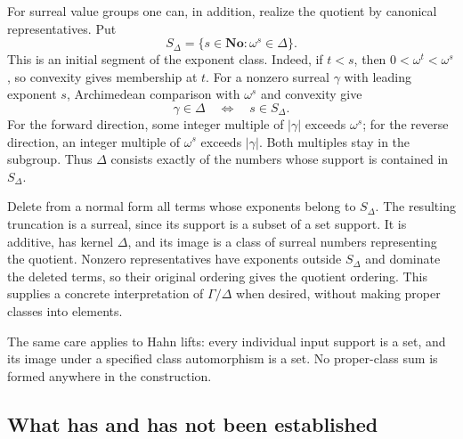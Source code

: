 \documentclass[11pt]{article}
\theoremstyle{definition}
\theoremstyle{remark}
\newcommand{\No}{\mathbf{No}}
\newcommand{\abs}[1]{\lvert #1\rvert}
\numberwithin{equation}{section}
\begin{document}
For surreal value groups one can, in addition, realize the quotient by
canonical representatives. Put
\[
 S_\Delta=\{s\in\No:\omega^s\in\Delta\}.
\]
This is an initial segment of the exponent class. Indeed, if $t<s$,
then $0<\omega^t<\omega^s$, so convexity gives membership at $t$.
For a nonzero surreal $\gamma$ with leading exponent $s$, Archimedean
comparison with $\omega^s$ and convexity give
\begin{equation}\label{eq:Delta-support}
 \gamma\in\Delta\quad\Longleftrightarrow\quad s\in S_\Delta.
\end{equation}
For the forward direction, some integer multiple of $\abs\gamma$
exceeds $\omega^s$; for the reverse direction, an integer multiple of
$\omega^s$ exceeds $\abs\gamma$. Both multiples stay in the subgroup.
Thus $\Delta$ consists exactly of the numbers whose support is contained
in $S_\Delta$.

Delete from a normal form all terms whose exponents belong to $S_\Delta$.
The resulting truncation is a surreal, since its support is a subset of a
set support. It is additive, has kernel $\Delta$, and its image is a class
of surreal numbers representing the quotient. Nonzero representatives
have exponents outside $S_\Delta$ and dominate the deleted terms, so their
original ordering gives the quotient ordering. This supplies a concrete
interpretation of $\Gamma/\Delta$ when desired, without making proper
classes into elements.

The same care applies to Hahn lifts: every individual input support is a
set, and its image under a specified class automorphism is a set. No
proper-class sum is formed anywhere in the construction.

\subsection{What has and has not been established}
\end{document}
